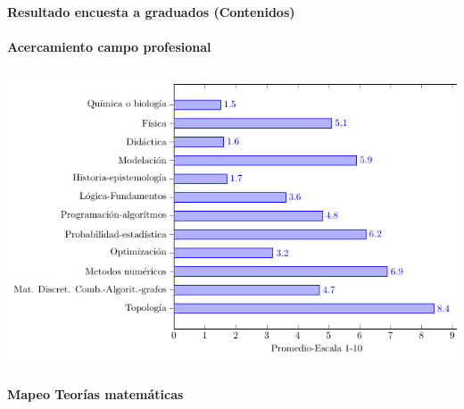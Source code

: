 \documentclass[a4paper,10pt,BCOR10mm,oneside,headsepline]{scrbook}
\begin{document}
\paragraph{Resultado encuesta a graduados (Contenidos)}
\paragraph{Acercamiento campo profesional}




\begin{center}
 \includegraphics[scale=.6]{barras7.png}
 
 \end{center} 








\paragraph{Mapeo Teorías matemáticas}
 
\end{document}
